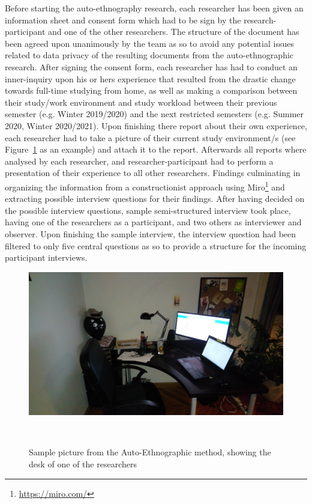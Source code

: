\documentclass{sigchi}
\begin{document}
Before starting the auto-ethnography research, each researcher has been given an information sheet and consent form which had to be sign by the research-participant and one of the other researchers. The structure of the document has been agreed upon unanimously by the team as so to avoid any potential issues related to data privacy of the resulting documents from the auto-ethnographic research.
After signing the consent form, each researcher has had to conduct an inner-inquiry upon his or hers experience that resulted from the drastic change towards full-time studying from home, as well as making a comparison between their study/work environment and study workload between their previous semester (e.g. Winter 2019/2020) and the next restricted semesters (e.g. Summer 2020, Winter 2020/2021).
Upon finishing there report about their own experience, each researcher had to take a picture of their current study environment/s (see Figure~\ref{fig:figure1} as an example) and attach it to the report. Afterwards all reports where analysed by each researcher, and researcher-participant had to perform a presentation of their experience to all other researchers. Findings culminating in organizing the information from a constructionist approach using Miro\footnote{\url{https://miro.com/}} and extracting possible interview questions for their findings. After having decided on the possible interview questions, sample semi-structured interview took place, having one of the researchers as a participant, and two others as interviewer and observer. Upon finishing the sample interview, the interview question had been filtered to only five central questions as so to provide a structure for the incoming participant interviews.

\begin{figure}
\centering
  \includegraphics[width=0.9\columnwidth]{figures/auto-e-picture}
  \caption{Sample picture from the Auto-Ethnographic method, showing the desk of one of the researchers}~\label{fig:figure1}
\end{figure}
\end{document}
